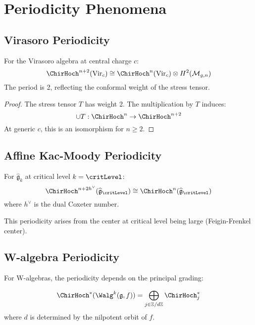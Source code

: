 \section{Periodicity Phenomena}

\subsection{Virasoro Periodicity}

\begin{theorem}
For the Virasoro algebra at central charge $c$:
$$\ChirHoch^{n+2}(\text{Vir}_c) \cong \ChirHoch^n(\text{Vir}_c) \otimes H^2(\mathcal{M}_{g,n})$$
The period is 2, reflecting the conformal weight of the stress tensor.
\end{theorem}

\begin{proof}
The stress tensor $T$ has weight 2. The multiplication by $T$ induces:
$$\cup T: \ChirHoch^n \to \ChirHoch^{n+2}$$
At generic $c$, this is an isomorphism for $n \geq 2$.
\end{proof}

\subsection{Affine Kac-Moody Periodicity}

\begin{theorem}
For $\widehat{\mathfrak{g}}_k$ at critical level $k = \critLevel$:
$$\ChirHoch^{n+2h^\vee}(\widehat{\mathfrak{g}}_{\critLevel}) \cong \ChirHoch^n(\widehat{\mathfrak{g}}_{\critLevel})$$
where $h^\vee$ is the dual Coxeter number.
\end{theorem}

This periodicity arises from the center at critical level being large (Feigin-Frenkel center).

\subsection{W-algebra Periodicity}

For W-algebras, the periodicity depends on the principal grading:

\begin{theorem}
$$\ChirHoch^*(\Walg^k(\mathfrak{g}, f)) = \bigoplus_{j \in \mathbb{Z}/d\mathbb{Z}} \ChirHoch^*_j$$
where $d$ is determined by the nilpotent orbit of $f$.
\end{theorem}

